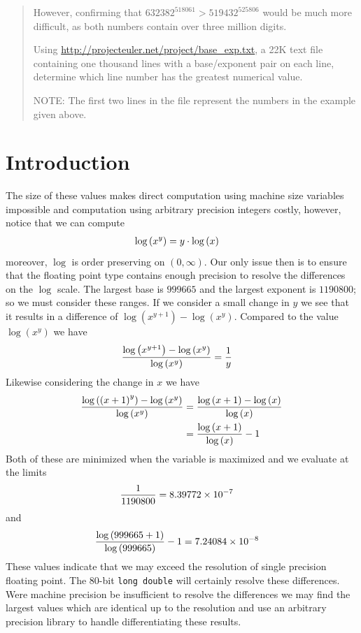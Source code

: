 \documentclass[oneside,12pt]{book}   	%
\newcounter{ex}
\newcounter{pr}
\theoremstyle{definition}
\begin{document}
\begin{spacing}{1.618}
\begin{quote}
			However, confirming that $632382^{518061} > 519432^{525806}$ would be much more difficult, as both numbers contain over three million digits.

			Using \url{http://projecteuler.net/project/base_exp.txt}, a 22K text file containing one thousand lines with a base/exponent pair on each line, determine which line number has the greatest numerical value.

			NOTE: The first two lines in the file represent the numbers in the example given above.
		\end{quote}
		
		\section{Introduction}
		
			The size of these values makes direct computation using machine size variables impossible and computation using arbitrary precision integers costly, however, notice that we can compute
			\begin{alignat}{4}
				\log{\left(x^y\right)}&=y\cdot\log{(x)} \notag 
			\end{alignat}
			moreover, $\log$ is order preserving on $(0, \infty)$. Our only issue then is to ensure that the floating point type contains enough precision to resolve the differences on the $\log$ scale. The largest base is $999665$ and the largest exponent is $1190800$; so we must consider these ranges. If we consider a small change in $y$ we see that it results in a difference of $\log{\left(x^{y+1}\right)}-\log{\left(x^y\right)}$. Compared to the value $\log{\left(x^y\right)}$ we have 
			\begin{alignat}{4}
				\frac{\log{\left(x^{y+1}\right)}-\log{\left(x^y\right)}}{\log{\left(x^y\right)}}&=\frac{1}{y} \notag
			\end{alignat}
			Likewise considering the change in $x$ we have 
			\begin{alignat}{4}
				\frac{\log{\left(\left(x+1\right)^y\right)}-\log{\left(x^y\right)}}{\log{\left(x^y\right)}}&=\frac{\log{(x+1)}-\log{(x)}}{\log{(x)}} \notag \\
					&=\frac{\log{(x+1)}}{\log{(x)}}-1 \notag 
			\end{alignat}
			Both of these are minimized when the variable is maximized and we evaluate at the limits
			\begin{alignat}{4}
				\frac{1}{1190800}&=8.39772\times 10^{-7}\notag 
			\end{alignat} 
			and
			\begin{alignat}{4}
				\frac{\log{(999665+1)}}{\log{(999665)}}-1&=7.24084\times 10^{-8} \notag 
			\end{alignat}
			These values indicate that we may exceed the resolution of single precision floating point. The 80-bit \texttt{long double} will certainly resolve these differences. Were machine precision be insufficient to resolve the differences we may find the largest values which are identical up to the resolution and use an arbitrary precision library to handle differentiating these results. 
			

\end{spacing}
\end{document}
